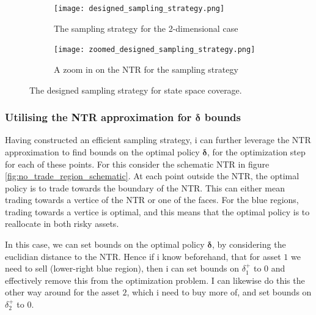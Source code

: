 \documentclass[11pt]{article}
\begin{document}
\begin{figure}[!ht]
  \centering
    \begin{subfigure}[t]{0.48\textwidth}
        \centering
        \texttt{[image: designed\_sampling\_strategy.png]}
        \caption{The sampling strategy for the 2-dimensional case}
        \label{fig: Designed_sampling_strategy}
    \end{subfigure}%
    \hfill
    \begin{subfigure}[t]{0.48\textwidth}
        \centering
        \texttt{[image: zoomed\_designed\_sampling\_strategy.png]}
        \caption{A zoom in on the \ac{NTR} for the sampling strategy}
        \label{fig: Designed_sampling_strategy-zoom}
    \end{subfigure}

\caption{The designed sampling strategy for state space coverage.}
\end{figure}

\subsubsection{Utilising the NTR approximation for $\boldsymbol{\delta}$ bounds} \label{Subsubsection: NTR-deltabounds}
Having constructed an efficient sampling strategy, i can further leverage the \ac{NTR} approximation to find bounds on the optimal policy $\boldsymbol{\delta}$,
for the optimization step for each of these points. For this consider the schematic \ac{NTR} in figure \ref{fig:no_trade_region_schematic}.
At each point outside the NTR, the optimal policy is to trade towards the boundary of the NTR. This can either mean trading towards a vertice of the \ac{NTR} or one of the faces.
For the blue regions, trading towards a vertice is optimal, and this means that the optimal policy is to reallocate in both risky assets.

In this case, we can set bounds on the optimal policy $\boldsymbol{\delta}$, by considering the euclidian distance to the \ac{NTR}.
Hence if i know beforehand, that for asset $1$ we need to sell (lower-right blue region), then i can set bounds on $\delta_{1}^{+}$ to $0$ and effectively remove this from the optimization problem.
I can likewise do this the other way around for the asset $2$, which i need to buy more of, and set bounds on $\delta_{2}^{+}$ to $0$.
\end{document}
